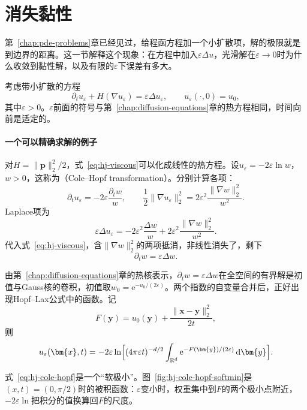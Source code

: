 \section{消失黏性}
\label{sec:hj-vanishing}

第~\ref{chap:pde-problems}章已经见过，给程函方程加一个小扩散项，解的极限就是到边界的距离。这一节解释这个现象：在方程中加入$\varepsilon\Delta u$，光滑解在$\varepsilon\to0$时为什么收敛到黏性解，以及有限的$\varepsilon$下误差有多大。

考虑带小扩散的方程
\begin{equation}
  \partial_tu_\varepsilon+H(\nabla u_\varepsilon)=\varepsilon\Delta u_\varepsilon,\qquad u_\varepsilon(\cdot,0)=u_0,
  \label{eq:hj-viscous}
\end{equation}
其中$\varepsilon>0$。$\varepsilon$前面的符号与第~\ref{chap:diffusion-equations}章的热方程相同，时间向前是适定的。

\paragraph{一个可以精确求解的例子}
对$H=\lVert\bm{p}\rVert_2^2/2$，式~\eqref{eq:hj-viscous}可以化成线性的热方程。设$u_\varepsilon=-2\varepsilon\ln w$，$w>0$，这称为（Cole--Hopf transformation）。分别计算各项：
\[
  \partial_tu_\varepsilon=-2\varepsilon\frac{\partial_tw}{w},\qquad
  \frac12\lVert\nabla u_\varepsilon\rVert_2^2=2\varepsilon^2\frac{\lVert\nabla w\rVert_2^2}{w^2}.
\]
Laplace项为
\[
  \varepsilon\Delta u_\varepsilon=-2\varepsilon^2\frac{\Delta w}{w}+2\varepsilon^2\frac{\lVert\nabla w\rVert_2^2}{w^2}.
\]
代入式~\eqref{eq:hj-viscous}，含$\lVert\nabla w\rVert_2^2$的两项抵消，非线性消失了，剩下
\[
  \partial_tw=\varepsilon\Delta w.
\]

由第~\ref{chap:diffusion-equations}章的热核表示，$\partial_tw=\varepsilon\Delta w$在全空间的有界解是初值与Gauss核的卷积，初值取$w_0=\mathrm{e}^{-u_0/(2\varepsilon)}$。两个指数的自变量合并后，正好出现Hopf--Lax公式中的函数。记
\[
  F(\bm{y})=u_0(\bm{y})+\frac{\lVert\bm{x}-\bm{y}\rVert_2^2}{2t},
\]
则
\begin{equation}
  u_\varepsilon(\bm{x},t)=-2\varepsilon\ln\Bigl[(4\pi\varepsilon t)^{-d/2}\int_{\mathbb{R}^{d}}\mathrm{e}^{-F(\bm{y})/(2\varepsilon)}\,\mathrm{d}\bm{y}\Bigr].
  \label{eq:hj-cole-hopf}
\end{equation}

式~\eqref{eq:hj-cole-hopf}是一个“软极小”。图~\ref{fig:hj-cole-hopf-softmin}是$(x,t)=(0,\pi/2)$时的被积函数：$\varepsilon$变小时，权重集中到$F$的两个极小点附近，$-2\varepsilon\ln$把积分的值换算回$F$的尺度。

